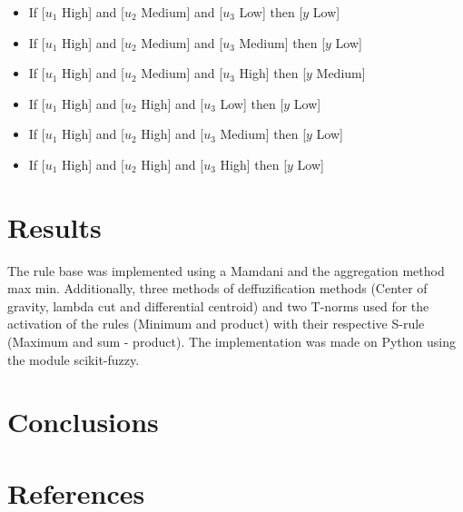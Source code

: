\documentclass[conference]{IEEEtran}
\begin{document}
\begin{itemize}
\item If [$u_1$ High] and [$u_2$ Medium] and [$u_3$ Low] then [$y$ Low]
\item If [$u_1$ High] and [$u_2$ Medium] and [$u_3$ Medium] then [$y$ Low]
\item If [$u_1$ High] and [$u_2$ Medium] and [$u_3$ High] then [$y$ Medium]
\item If [$u_1$ High] and [$u_2$ High] and [$u_3$ Low] then [$y$ Low]
\item If [$u_1$ High] and [$u_2$ High] and [$u_3$ Medium] then [$y$ Low]
\item If [$u_1$ High] and [$u_2$ High] and [$u_3$ High] then [$y$ Low]
\end{itemize}

\section{Results}
The rule base was implemented using a Mamdani and the aggregation method max min. Additionally, three methods of deffuzification methods (Center of gravity, lambda cut and differential centroid) and two T-norms used for the activation of the rules (Minimum and product) with their respective S-rule (Maximum and sum - product). The implementation was made on Python using the module scikit-fuzzy.

\section{Conclusions}

\section*{References}

\nocite{*}


\end{document}
